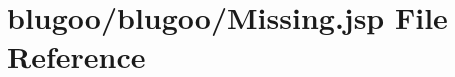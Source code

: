 \hypertarget{Missing_8jsp}{
\section{blugoo/blugoo/Missing.jsp File Reference}
\label{Missing_8jsp}
}



